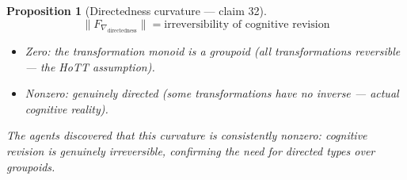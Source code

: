 \documentclass[11pt,a4paper]{article}
\newtheorem{proposition}[definition]{Proposition}
\begin{document}
\begin{proposition}[Directedness curvature --- claim 32]
\label{prop:dir_curv}
\[
  \|F_{\nabla_{\text{directedness}}}\| = \text{irreversibility of
    cognitive revision}
\]
\begin{itemize}
  \item Zero: the transformation monoid is a groupoid (all transformations
    reversible --- the HoTT assumption).
  \item Nonzero: genuinely directed (some transformations have no
    inverse --- actual cognitive reality).
\end{itemize}
The agents discovered that this curvature is consistently nonzero:
cognitive revision is genuinely irreversible, confirming the need for
directed types over groupoids.
\end{proposition}
\end{document}
